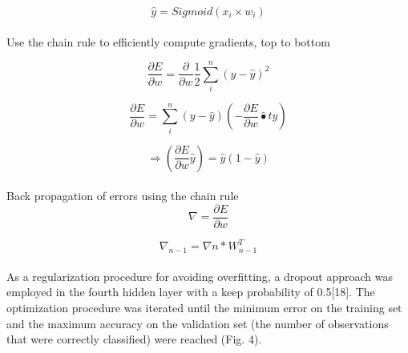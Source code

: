 \documentclass{llncs}       %
\begin{document}
\begin{equation} 
\widehat{y}=Sigmoid(x_{i}\times w_{i})
\end{equation}

\paragraph{}
\paragraph{} Use the chain rule to efficiently compute gradients, top to bottom

\begin{equation} 
\frac{\partial E}{\partial w}=\frac{\partial }{\partial w} \frac{1}{2}\sum_i^n( y -\widehat{y})^2
\end{equation}

\begin{equation} 
\frac{\partial E}{\partial w} = \sum_i^n ( y -\widehat{y})  (-\frac{\partial E}{\partial w}\widehat{•}t{y})
\end{equation}

\begin{equation} 
\Rightarrow(\frac{\partial E}{\partial w}\widehat{y})= \widehat{y}(1-\widehat{y})
\end{equation}

\paragraph{}
\paragraph{}Back propagation of errors using the chain rule
\begin{equation} 
\nabla=\frac{\partial E}{\partial w}
\end{equation}

\begin{equation} 
\nabla_{n-1}=\nabla{n}*W^{T}_{n-1}
\end{equation}

\paragraph{}
\paragraph{}
As a regularization procedure for avoiding overfitting, a dropout approach was employed in the fourth hidden layer with a keep probability of 0.5[18]. The optimization procedure was iterated until the minimum error on the training set and the maximum accuracy on the validation set (the number of observations that were correctly classified) were reached (Fig. 4). 
\end{document}
